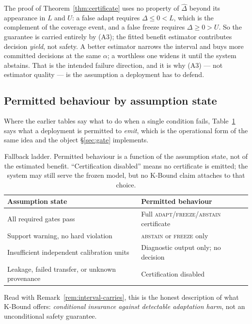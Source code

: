 \begin{remark}\label{rem:interval-carries}
The proof of Theorem~\ref{thm:certificate} uses no property of $\widehat\Delta$ beyond
its appearance in $L$ and $U$: a false adapt requires $\Delta\le0<L$, which is the
complement of the coverage event, and a false freeze requires $\Delta\ge0>U$. So the
guarantee is carried entirely by (A3); the fitted benefit estimator contributes decision
\emph{yield}, not safety. A better estimator narrows the interval and buys more committed
decisions at the same $\alpha$; a worthless one widens it until the system abstains. That
is the intended failure direction, and it is why (A3) --- not estimator quality --- is
the assumption a deployment has to defend.
\end{remark}

\subsection{Permitted behaviour by assumption state}\label{sec:fallback-ladder}

Where the earlier tables say what to do when a single condition fails,
Table~\ref{tab:fallback-ladder} says what a deployment is permitted to \emph{emit},
which is the operational form of the same idea and the object \S\ref{sec:gate}
implements.

\begin{table}[htbp]
\centering
\small
\caption{Fallback ladder. Permitted behaviour is a function of the assumption state, not
of the estimated benefit. ``Certification disabled'' means no certificate is emitted; the
system may still serve the frozen model, but no K-Bound claim attaches to that choice.}
\label{tab:fallback-ladder}
\begin{tabular}{@{}p{}p{}@{}}
\toprule
Assumption state & Permitted behaviour \\
\midrule
All required gates pass
  & Full \textsc{adapt}/\textsc{freeze}/\textsc{abstain} certificate \\
Support warning, no hard violation
  & \textsc{abstain} or \textsc{freeze} only \\
Insufficient independent calibration units
  & Diagnostic output only; no decision \\
Leakage, failed transfer, or unknown provenance
  & Certification disabled \\
\bottomrule
\end{tabular}
\end{table}

Read with Remark~\ref{rem:interval-carries}, this is the honest description of what
K-Bound offers: \emph{conditional insurance against detectable adaptation harm}, not an
unconditional safety guarantee.
